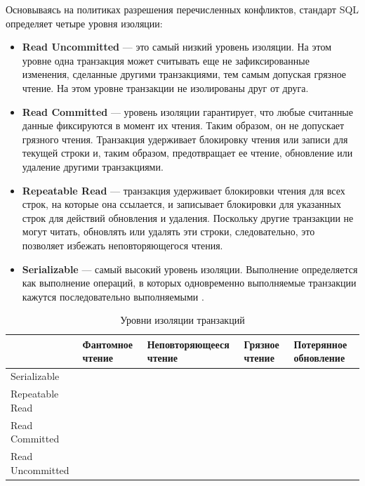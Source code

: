 Основываясь на политиках разрешения перечисленных конфликтов, стандарт SQL определяет четыре уровня изоляции:

\begin{itemize}
    \item 
        \textbf{Read Uncommitted} — это самый низкий уровень изоляции. На этом уровне одна транзакция может считывать еще не зафиксированные изменения, сделанные другими транзакциями, тем самым допуская грязное чтение. На этом уровне транзакции не изолированы друг от друга.
    \item 
        \textbf{Read Committed} — уровень изоляции гарантирует, что любые считанные данные фиксируются в момент их чтения. Таким образом, он не допускает грязного чтения. Транзакция удерживает блокировку чтения или записи для текущей строки и, таким образом, предотвращает ее чтение, обновление или удаление другими транзакциями.
    \item 
        \textbf{Repeatable Read} — транзакция удерживает блокировки чтения для всех строк, на которые она ссылается, и записывает блокировки для указанных строк для действий обновления и удаления. Поскольку другие транзакции не могут читать, обновлять или удалять эти строки, следовательно, это позволяет избежать неповторяющегося чтения.
    \item 
        \textbf{Serializable} — самый высокий уровень изоляции. Выполнение определяется как выполнение операций, в которых одновременно выполняемые транзакции кажутся последовательно выполняемыми \autocite{BeginningSQL}.
\end{itemize}

\begin{table}[h]
\begin{tabularx}{\textwidth}{|X|X|X|X|X|}
    \hline
                     & Фантомное чтение         & Неповторяющееся чтение   & Грязное чтение           & Потерянное обновление    \\ \hline
    Serializable     & \cellcolor[HTML]{32CB00} & \cellcolor[HTML]{32CB00} & \cellcolor[HTML]{32CB00} & \cellcolor[HTML]{32CB00} \\ \hline
    Repeatable Read  & \cellcolor[HTML]{FE0000} & \cellcolor[HTML]{32CB00} & \cellcolor[HTML]{32CB00} & \cellcolor[HTML]{32CB00} \\ \hline
    Read Committed   & \cellcolor[HTML]{FE0000} & \cellcolor[HTML]{FE0000} & \cellcolor[HTML]{32CB00} & \cellcolor[HTML]{32CB00} \\ \hline
    Read Uncommitted & \cellcolor[HTML]{FE0000} & \cellcolor[HTML]{FE0000} & \cellcolor[HTML]{FE0000} & \cellcolor[HTML]{32CB00} \\ \hline
\end{tabularx}
\caption{Уровни изоляции транзакций}
\end{table}


